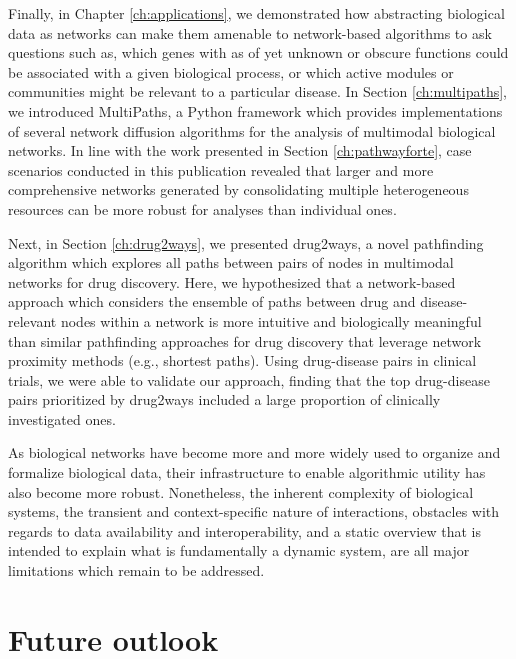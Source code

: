 Finally, in Chapter \ref{ch:applications}, we demonstrated how abstracting biological data as networks can make them amenable to network-based algorithms to ask questions such as, which genes with as of yet unknown or obscure functions could be associated with a given biological process, or which active modules or communities might be relevant to a particular disease. In Section \ref{ch:multipaths}, we introduced MultiPaths, a Python framework which provides implementations of several network diffusion algorithms for the analysis of multimodal biological networks. In line with the work presented in Section \ref{ch:pathwayforte}, case scenarios conducted in this publication revealed that larger and more comprehensive networks generated by consolidating multiple heterogeneous resources can be more robust for analyses than individual ones. 

Next, in Section \ref{ch:drug2ways}, we presented drug2ways, a novel pathfinding algorithm which explores all paths between pairs of nodes in multimodal networks for drug discovery. Here, we hypothesized that a network-based approach which considers the ensemble of paths between drug and disease-relevant nodes within a network is more intuitive and biologically meaningful than similar pathfinding approaches for drug discovery that leverage network proximity methods (e.g., shortest paths). Using drug-disease pairs in clinical trials, we were able to validate our approach, finding that the top drug-disease pairs prioritized by drug2ways included a large proportion of clinically investigated ones.

As biological networks have become more and more widely used to organize and formalize biological data, their infrastructure to enable algorithmic utility has also become more robust. Nonetheless, the inherent complexity of biological systems, the transient and context-specific nature of interactions, obstacles with regards to data availability and interoperability, and a static overview that is intended to explain what is fundamentally a dynamic system, are all major limitations which remain to be addressed. 

\section{Future outlook}

